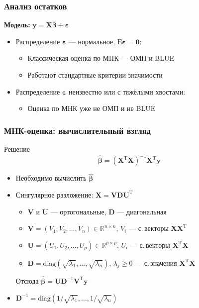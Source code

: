 \documentclass[ucs, notheorems, handout]{beamer}
\newcommand{\betah}{\hat{\bm \beta}}
\newcommand{\betaa}{\bm{\beta}}
\newcommand{\epss}{\bm{\varepsilon}}
\newcommand{\E}{\mathrm{E}}
\newcommand{\XT}{{\bm{X}}^{\mathrm{T}}}
\newcommand{\X}{\bm{X}}
\begin{document}
	
	\begin{frame}
	    \frametitle{Анализ остатков}
	    \textbf{Модель:} $\bm y = \X \betaa + \epss$
	
	\begin{itemize}
		\item Распределение $\epss$ --- нормальное, $\E \epss = \bm 0$:
	 \begin{itemize}
	 	\item Классическая оценка по МНК --- ОМП и BLUE
		\item Работают стандартные критерии значимости
	 \end{itemize}
	 		\item Распределение $\epss$ неизвестно или с тяжёлыми хвостами:
	 			\begin{itemize}
	 				\item Оценка по МНК уже не ОМП и не BLUE
	 			\end{itemize}
	\end{itemize}
	\end{frame}
	
	\begin{frame}
	    \frametitle{МНК-оценка: вычислительный взгляд}
	
	\begin{block}{Решение}
	$$\betah = (\X^\mathrm{T}\X)^{-1} \X^\mathrm{T} \bm y$$
	\end{block}	
	
	\begin{itemize}
	\item Необходимо вычислить $\betah$
	\item Сингулярное разложение: $\X = \bm V \bm D \bm U^\mathrm T$
	\begin{itemize}
	\item $\bm V$ и $\bm U$ --- ортогональные, $\bm D$ --- диагональная
	\item $\bm V = (V_1, V_2, \ldots, V_n) \in \mathbb R^{n\times n}$, $V_i$ --- с.\,векторы $\X \XT$
	\item $\bm U = (U_1, U_2, \ldots, U_p) \in \mathbb R^{p\times p}$, $U_i$ --- с.\,векторы $\XT \X$
	\item $\bm D = \mathrm{diag}(\sqrt{\lambda_1}, \ldots,\sqrt{\lambda_n})$, $\lambda_j \geqslant 0$ --- с.\,значения $\XT \X$
	\end{itemize}
	
	Отсюда $\betah = \bm U \bm D^{-1} \bm V^\mathrm T\bm y$
	\item $\bm D^{-1} = \mathrm{diag} (1/\sqrt{\lambda_1}, \ldots, 1/\sqrt{\lambda_n})$ 
	\end{itemize}
	    \note{
	
	    }
	\end{frame}
	
\end{document}
